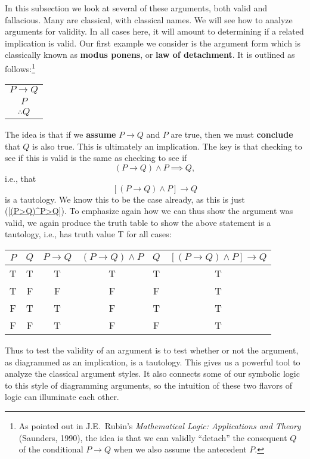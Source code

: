 In this subsection
we look at several of these arguments, both valid and fallacious.
Many are classical, with classical names.  We will see how to 
analyze arguments for validity.  In all cases here, it will
amount to determining if a related implication is valid.
\newpage
\bex Our first example we consider is the argument form which is 
classically known as {\bf modus ponens}, or {\bf law of
detachment}.  It is outlined as follows:\footnote{%
As pointed out in J.E.\ Rubin's {\it Mathematical Logic: Applications
and Theory} (Saunders, 1990), 
the idea is that we
can validly ``detach'' the consequent
$Q$ of the conditional $P\longrightarrow Q$ when we also assume
the antecedent $P$.
}
\begin{center}
\begin{tabular}{c}
$P\longrightarrow Q$\\ $P$\\ 
\hline
$\therefore Q$
\end{tabular}
\end{center}
The idea is that if we {\bf assume} $P\longrightarrow Q$ and $P$ are
true, then we must {\bf conclude} that $Q$ is also true.
This is ultimately an implication. 
The key is that checking
to see if this is valid is the same as checking to see if 
$$(P\longrightarrow Q)\wedge P\implies Q,$$
i.e., that
$$[(P\longrightarrow Q)\wedge P]\longrightarrow Q$$
is a tautology.  We know this to be the case already, as this is
just (\ref{(P>Q)^P>Q}).  To emphasize again how we can thus
show the argument was valid, we again produce the truth table
to show the above statement is a tautology, i.e., has
truth value {\rm T} for all cases:
\begin{center}{\rm
\begin{tabular}{|c|c||c|c|c|c|}
\hline
$P$&$Q$&$P\rightarrow Q$&$(P\rightarrow Q)\wedge P$&$Q$
&$[(P\rightarrow Q)\wedge P]\longrightarrow Q$\\ \hline
T&T&T&T&T&T\\
T&F&F&F&F&T\\
F&T&T&F&T&T\\
F&F&T&F&F&T\\
\hline
\end{tabular}}\end{center}
\label{ModusPonensExample}\eex

Thus
to test the validity of an argument
is to test whether or not the argument, as diagrammed as
an implication, is a tautology.
This gives us a powerful tool to analyze the classical argument styles.
It also connects some of our symbolic logic to this style of diagramming
arguments, so the intuition
of these two flavors of logic can illuminate each other.

